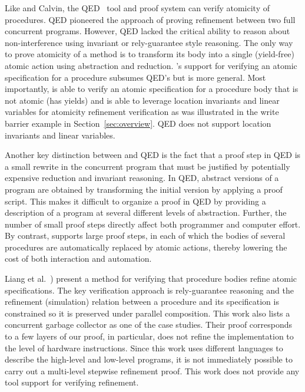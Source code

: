 Like \civl and Calvin, the QED~\cite{ElmasQT09} tool and proof system
can verify atomicity of procedures. 
QED pioneered the approach of
proving refinement between two full concurrent programs. 
However, QED lacked the critical ability to reason about
non-interference using invariant or rely-guarantee style reasoning.
The only way to prove atomicity of a method is to transform its body
into a single (yield-free) atomic action using abstraction and
reduction. 
\civl's
support for verifying an atomic specification for a procedure subsumes
QED's but is more general. 
Most importantly, \civl is able to verify
an atomic specification for a procedure body that is not atomic (has
yields) and is able to leverage location invariants and linear
variables for atomicity
refinement verification as was illustrated in the write barrier
example in Section~\ref{sec:overview}. 
QED does not support location invariants and linear variables. 

Another key distinction between \civl and QED is the fact that a proof step in QED is a small rewrite in the concurrent program
that must be justified by potentially expensive reduction and invariant reasoning.
In QED, abstract versions of a program are obtained by transforming the initial
version by applying a proof script. 
This makes it difficult to organize a proof in QED by providing a
description of a program at several different levels of abstraction. 
Further, the number of small proof steps directly affect both programmer
and computer effort. 
By contrast, \civl supports large proof steps, in each of which the bodies of several procedures
are automatically replaced by atomic actions, thereby lowering the cost of both interaction and automation.

Liang et al.~\cite{LiangRGSim}) present a method for verifying that procedure
bodies refine atomic specifications. 
The key verification approach is
rely-guarantee reasoning and the refinement (simulation) relation between
a procedure and its specification is constrained so it is preserved under
parallel composition. 
This work also lists a concurrent garbage collector as one of the case
studies. 
Their proof corresponds to a few layers of our proof, in particular,
does not refine the implementation to the level of hardware
instructions. 
Since this work uses different languages to describe the high-level
and low-level programs, it is not immediately possible to carry out a
multi-level stepwise refinement proof. 
This work does not provide any tool support for verifying refinement. 

